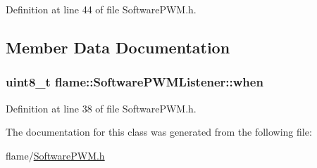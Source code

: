 Definition at line 44 of file Software\-P\-W\-M.\-h.



\subsection{Member Data Documentation}
\hypertarget{classflame_1_1_software_p_w_m_listener_a0f8297e9d8ac43c30c02585bf1e220b1}{
\subsubsection[{when}]{\setlength{\rightskip}{0pt plus 5cm}uint8\-\_\-t flame\-::\-Software\-P\-W\-M\-Listener\-::when}}\label{classflame_1_1_software_p_w_m_listener_a0f8297e9d8ac43c30c02585bf1e220b1}


Definition at line 38 of file Software\-P\-W\-M.\-h.



The documentation for this class was generated from the following file\-:\begin{DoxyCompactItemize}
\item 
flame/\hyperlink{_software_p_w_m_8h}{Software\-P\-W\-M.\-h}\end{DoxyCompactItemize}
